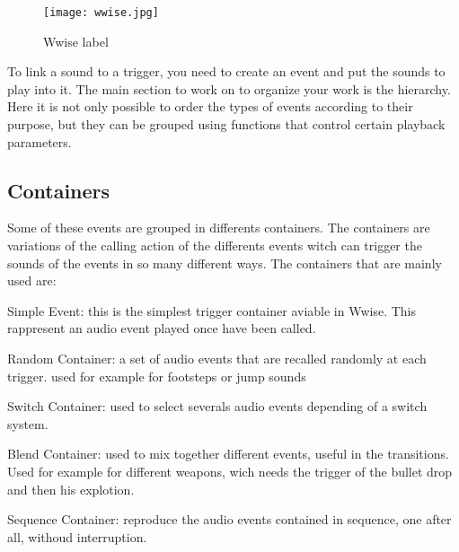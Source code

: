 \begin{figure}
	\begin{center}
		\texttt{[image: wwise.jpg]}
		\caption{Wwise label}
	\end{center}
\end{figure}

To link a sound to a trigger, you need to create an event and put the sounds to play into it. The main section to work on to organize your work is the hierarchy. Here it is not only possible to order the types of events according to their purpose, but they can be grouped using functions that control certain playback parameters. 

	\subsection{Containers}
	Some of these events are grouped in differents containers. The containers are variations of the calling action of the differents events witch can trigger the sounds of the events in so many different ways. The containers that are mainly used are:
	
	\begin{compactitem}
		\item Simple Event: this is the simplest trigger container aviable in Wwise. This rappresent an audio event played once have been called.
		\item Random Container:  a set of audio events that are recalled randomly at each trigger. used for example for footsteps or jump sounds
		\item Switch Container: used to select severals audio events depending of a switch system.
		\item Blend Container: used to mix together different events, useful in the transitions. Used for example for different weapons, wich needs the trigger of the bullet drop and then his explotion.
		\item Sequence Container: reproduce the audio events contained in sequence, one after all, withoud interruption.
	\end{compactitem}

